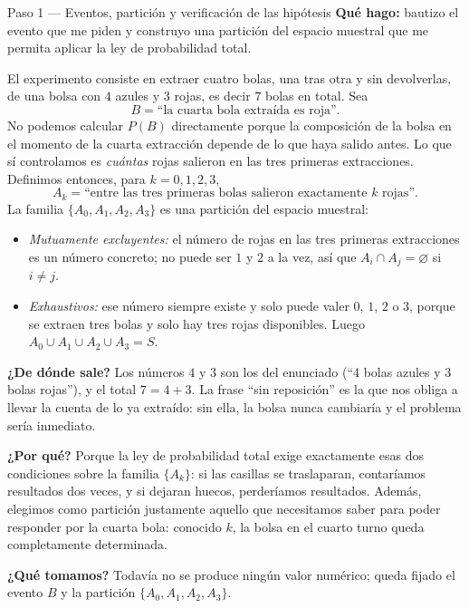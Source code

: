 \documentclass[11pt]{article}
\begin{document}
\begin{paso}{Paso 1 --- Eventos, partición y verificación de las hipótesis}
\textbf{Qué hago:} bautizo el evento que me piden y construyo una partición del espacio muestral que me permita aplicar la ley de probabilidad total.

El experimento consiste en extraer cuatro bolas, una tras otra y sin devolverlas, de una bolsa con $4$ azules y $3$ rojas, es decir $7$ bolas en total. Sea
\[
B=\text{``la cuarta bola extraída es roja''}.
\]
No podemos calcular $P(B)$ directamente porque la composición de la bolsa en el momento de la cuarta extracción depende de lo que haya salido antes. Lo que sí controlamos es \emph{cuántas} rojas salieron en las tres primeras extracciones. Definimos entonces, para $k=0,1,2,3$,
\[
A_k=\text{``entre las tres primeras bolas salieron exactamente $k$ rojas''}.
\]
La familia $\{A_0,A_1,A_2,A_3\}$ es una partición del espacio muestral:
\begin{itemize}[leftmargin=1.4em]
\item \emph{Mutuamente excluyentes:} el número de rojas en las tres primeras extracciones es un número concreto; no puede ser $1$ y $2$ a la vez, así que $A_i\cap A_j=\varnothing$ si $i\neq j$.
\item \emph{Exhaustivos:} ese número siempre existe y solo puede valer $0$, $1$, $2$ o $3$, porque se extraen tres bolas y solo hay tres rojas disponibles. Luego $A_0\cup A_1\cup A_2\cup A_3=S$.
\end{itemize}

\textbf{¿De dónde sale?} Los números $4$ y $3$ son los del enunciado (``4 bolas azules y 3 bolas rojas''), y el total $7=4+3$. La frase ``sin reposición'' es la que nos obliga a llevar la cuenta de lo ya extraído: sin ella, la bolsa nunca cambiaría y el problema sería inmediato.

\textbf{¿Por qué?} Porque la ley de probabilidad total exige exactamente esas dos condiciones sobre la familia $\{A_k\}$: si las casillas se traslaparan, contaríamos resultados dos veces, y si dejaran huecos, perderíamos resultados. Además, elegimos como partición justamente aquello que necesitamos saber para poder responder por la cuarta bola: conocido $k$, la bolsa en el cuarto turno queda completamente determinada.

\textbf{¿Qué tomamos?} Todavía no se produce ningún valor numérico; queda fijado el evento $B$ y la partición $\{A_0,A_1,A_2,A_3\}$.
\end{paso}
\end{document}

